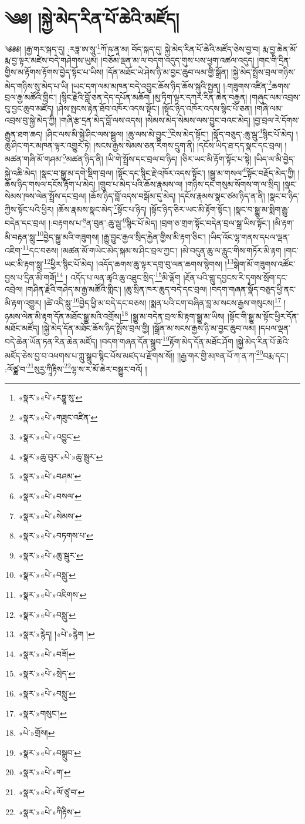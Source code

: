 \chapter{༄༅། །སྐྱེ་མེད་རིན་པོ་ཆེའི་མཛོད།}༄༅༅། །རྒྱ་གར་སྐད་དུ། :རཏྣ་ཨ་སཱུ་\footnote{«སྣར་»«པེ་»རཏྣཱ་སུ་}ཀོ་ཥ་ནཱ་མ། བོད་སྐད་དུ། སྐྱེ་མེད་རིན་པོ་ཆེའི་མཛོད་ཅེས་བྱ་བ། རྨ་བྱ་ཆེན་མོ་རྨ་བྱ་ལྟར་མཛེས་བདེ་གཤེགས་ཡུམ། །བཅོམ་ལྡན་མ་ལ་བདག་འདུད་གུས་པས་ཕྱག་འཚལ་འདུད། །གང་གི་དྲིན་གྱིས་མ་རྟོགས་རྟོགས་བྱེད་སྟོང་པ་ཡིས། །དོན་མཐོང་ཡེ་ཤེས་ཉི་མ་བྱང་ཆུབ་ལམ་གྱི་སྒྲོན། །སྐྱེ་མེད་སྤྲོས་བྲལ་གཉིས་མེད་གཉིས་སུ་མེད་པ་ཡི། །ཡང་དག་ལམ་མཁན་བདེ་འབྱུང་ཆོས་ཉིད་ཆོས་སྐུའི་སྤྱན། །:གཟུགས་འཛིན་\footnote{«སྣར་»«པེ་»གཟུང་འཛིན་}ཆགས་བྲལ་རྒྱ་མཚོའི་གླིང་། །སྙིང་རྗེའི་བློ་ཅན་དེད་དཔོན་མཆོག །མུ་ཏིག་ལྟར་དཀར་རིན་ཆེན་བརྒྱན། །གཞུང་ལམ་འབྲས་བུ་བྱང་ཆུབ་མཛོད། །ཤེས་སྤངས་རྟེན་ཐོབ་འཁོར་འདས་སྟོང་། །སྟོང་ཉིད་འཁོར་འདས་སྙིང་པོ་ཅན། །གཞི་ལམ་འབྲས་བུ་སྐྱེ་མེད་ཀྱི། །གཞི་རྩ་དྲན་མེད་བློ་ལས་འདས། །སེམས་མེད་སེམས་ལས་བྱུང་བའང་མེད། །བྱ་བྲལ་རེ་དོགས་རྒྱུན་ཐག་ཆད། །ཤིང་ལས་མི་སྐྱེ་ཤིང་ལས་སྦྲུལ། །ཆུ་ལས་མེ་བྱུང་\footnote{«སྣར་»«པེ་»འབྱུང་}ངེས་མེད་སྟོང་། །སྣོད་བཅུད་:ཆུ་ལྦུ་\footnote{«སྣར་»ཆུ་བུར་«པེ་»ཆུ་སྦུར་}སྙིང་པོ་མེད། །ཆུ་ཤིང་གར་མཁན་ལྟར་འགྱུར་ཏེ། །སངས་རྒྱས་སེམས་ཅན་རིགས་དྲུག་ནི། །དངོས་ཡིད་ཐ་དད་སྣང་དང་བྲལ། །མཚན་གཞི་མོ་གཤམ་\footnote{«སྣར་»«པེ་»བཤམ་}མཚན་ཉིད་ནི། །ཡི་གེ་སྤྲོས་དང་བྲལ་བ་ཉིད། །ཅིར་ཡང་མི་རྟོག་སྟོང་པ་སྟེ། །ཡིད་ལ་མི་བྱེད་སྐྱེ་འཆི་མེད། །སྣང་བ་སྒྱུ་མ་དགེ་སྡིག་བྲལ། །སྟོང་དང་སྙིང་རྗེ་འཁོར་འདས་སྟོང་། །སྒྱུ་མ་གསལ་\footnote{«སྣར་»«པེ་»བསལ་}སྟོང་བརྗོད་མེད་ཀྱི། །ཆོས་ཉིད་གསལ་དངོས་རྟོག་པ་མེད། །གྲུབ་པ་མེད་པའི་ཆོས་རྣམས་ལ། །གཉིས་དང་གསུམ་སོགས་ག་ལ་སྲིད། །སྣང་སེམས་ཁས་ལེན་སྤྲོས་དང་བྲལ། །ཆོས་ཉིད་བློ་འདས་བསྒོམ་དུ་མེད། །དངོས་རྣམས་སྣང་ཙམ་ཉིད་ན་ནི། །སྣང་བ་ཉིད་ཀྱིས་སྟོང་པའི་ཕྱིར། །ཆོས་རྣམས་སྣང་མེད་\footnote{«སྣར་»«པེ་»སེམས་}སྟོང་པ་ཉིད། །སྟོང་ཉིད་ཅིར་ཡང་མི་རྟོག་སྟོང་། །སྣང་བ་སྒྱུ་མ་སྨིག་རྒྱུ་བདེན་དང་བྲལ། །:བརྟགས་པ་\footnote{«སྣར་»«པེ་»བཏགས་པ་}ན་བུན་:ཆུ་ལྦུ་\footnote{«སྣར་»«པེ་»ཆུ་སྦུར་}སྙིང་པོ་མེད། །བྲག་ཅ་གྲག་སྟོང་བདེན་བྲལ་སྒྲ་ཡིས་སྟོང་། །མི་རྟག་མི་བརྟན་སླུ་\footnote{«སྣར་»«པེ་»བསླུ་}བྱེད་སྒྱུ་མའི་གཟུགས། །རྒྱུ་བྱུང་རྒྱལ་སྲིད་རྐྱེན་གྱིས་མི་རྟག་ཅིང་། །ཡིད་འོང་ལྷ་གནས་དཔལ་ལྡན་འཇིག་\footnote{«སྣར་»«པེ་»འཇིགས་}དང་བཅས། །མཚན་མོ་གཡེང་མེད་སྐམ་ས་ཤིང་བྲལ་ཀྱང་། །མེ་བདུན་ཆུ་ལ་རླུང་གིས་གཏོར་མི་རྟག །གང་ཡང་མི་རྟག་སླུ་\footnote{«སྣར་»«པེ་»བསླུ་}ཕྱིར་སྙིང་པོ་མེད། །འདོད་ཆགས་ཆུ་ལྟར་དགྲ་བུ་ལན་ཆགས་སྙེགས། །\footnote{«སྣར་»རྙེད། །«པེ་»རྙེག །}སྒེག་མོ་གཟུགས་འཚོང་བྱས་པ་དྲིན་མི་གཟོ།\footnote{«སྣར་»«པེ་»བཟོ།} །
འདོད་པ་ལན་ཚྭའི་ཆུ་འཐུང་སྲིད་\footnote{«སྣར་»«པེ་»སྲེད་}མི་ལྡོག །རྔོན་པའི་གླུ་དབྱངས་རི་དྭགས་སྲོག་དང་འབྲེལ། །གཤིན་རྗེའི་གཤེད་མ་རྒྱ་མཚོའི་གླིང་། །ཆུ་སྲིན་ཁར་ཆུད་བདེ་དང་བྲལ། །བདག་གཞན་སྣོད་བཅུད་ཕྱི་ནང་མི་རྟག་འགྱུར། །ཚེ་འདི་སླུ་\footnote{«སྣར་»«པེ་»བསླུ་}བྱེད་ཕྱི་མ་བདེ་དང་བཅས། །སྨན་པའི་ངག་བཞིན་བླ་མ་སངས་རྒྱས་གསུངས།\footnote{«སྣར་»གསུང་།} །ཉམས་ལེན་མི་རྟག་དོན་མཐོང་སྒྱུ་མའི་འགྲོས།\footnote{«པེ་»གྲོས།} །སྒྱུ་མ་བདེན་བྲལ་མི་རྟག་སྒྱུ་མ་ཡིས། །སྟོང་གི་སྒྱུ་མ་སྟོང་ཕྱིར་དོན་མཐོང་མཛོད། །སྐྱེ་མེད་དོན་མཐོང་ཆོས་ཉིད་སྤྲོས་བྲལ་གྱི། །སྒྲོན་མ་སངས་རྒྱས་ཉི་མ་བྱང་ཆུབ་ལམ། །དཔལ་ལྡན་བདེ་ཆེན་ཡོན་ཏན་རིན་ཆེན་མཛོད། །བདག་གཞན་དོན་སྒྲུབ་\footnote{«སྣར་»«པེ་»བསྒྲུབ་}རྟོག་མེད་དོན་མཐོང་ཤོག །སྐྱེ་མེད་རིན་པོ་ཆེའི་མཛོད་ཅེས་བྱ་བ་འཕགས་པ་ཀླུ་སྒྲུབ་སྙིང་པོས་མཛད་པ་རྫོགས་སོ།། །།རྒྱ་གར་གྱི་མཁན་པོ་ཀ་ན་ཀ་\footnote{«སྣར་»«པེ་»ག་}བརྨ་དང་། :ལོཙྪ་བ་\footnote{«སྣར་»«པེ་»ལོ་ཙཱ་བ་}སུརྱ་ཀཱིརྟིས་\footnote{«སྣར་»«པེ་»ཀིརྟིས་}ལྷ་ས་ར་མོ་ཆེར་བསྒྱུར་བའོ། ། 